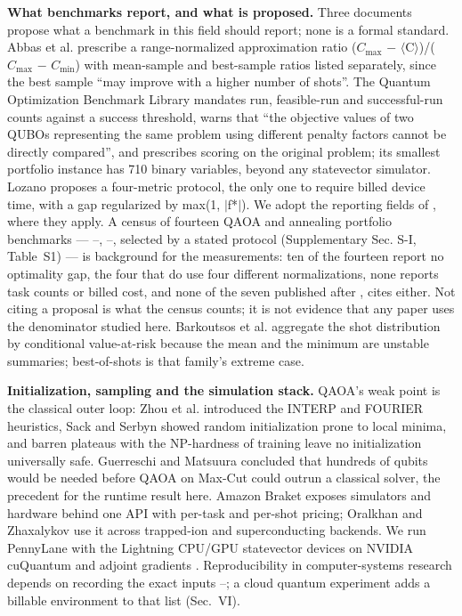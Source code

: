 \documentclass{ieeeaccess}
\begin{document}
\textbf{What benchmarks report, and what is proposed.} Three documents propose what a benchmark in this field should report; none is a formal standard. Abbas et al. \cite{ref19} prescribe a range-normalized approximation ratio ($C_{\mathrm{max}}$ $-$ $\langle$C$\rangle$)/($C_{\mathrm{max}}$ $-$ $C_{\mathrm{min}}$) with mean-sample and best-sample ratios listed separately, since the best sample ``may improve with a higher number of shots''. The Quantum Optimization Benchmark Library \cite{ref20} mandates run, feasible-run and successful-run counts against a success threshold, warns that ``the objective values of two QUBOs representing the same problem using different penalty factors cannot be directly compared'', and prescribes scoring on the original problem; its smallest portfolio instance has 710 binary variables, beyond any statevector simulator. Lozano \cite{ref21} proposes a four-metric protocol, the only one to require billed device time, with a gap regularized by max(1, $|$f*$|$). We adopt the reporting fields of \cite{ref19}, \cite{ref20} where they apply. A census of fourteen QAOA and annealing portfolio benchmarks --- \cite{ref8}--\cite{ref15}, \cite{ref22}--\cite{ref27}, selected by a stated protocol (Supplementary Sec. S-I, Table~S1) --- is background for the measurements: ten of the fourteen report no optimality gap, the four that do use four different normalizations, none reports task counts or billed cost, and none of the seven published after \cite{ref19}, \cite{ref20} cites either. Not citing a proposal is what the census counts; it is not evidence that any paper uses the denominator studied here. Barkoutsos et al. \cite{ref28} aggregate the shot distribution by conditional value-at-risk because the mean and the minimum are unstable summaries; best-of-shots is that family's extreme case.


\textbf{Initialization, sampling and the simulation stack.} QAOA's weak point is the classical outer loop: Zhou et al. \cite{ref29} introduced the INTERP and FOURIER heuristics, Sack and Serbyn \cite{ref30} showed random initialization prone to local minima, and barren plateaus \cite{ref31} with the NP-hardness of training \cite{ref32} leave no initialization universally safe. Guerreschi and Matsuura \cite{ref33} concluded that hundreds of qubits would be needed before QAOA on Max-Cut could outrun a classical solver, the precedent for the runtime result here. Amazon Braket \cite{ref34} exposes simulators and hardware behind one API with per-task and per-shot pricing; Oralkhan and Zhaxalykov \cite{ref23} use it across trapped-ion and superconducting backends. We run PennyLane \cite{ref35} with the Lightning CPU/GPU statevector devices on NVIDIA cuQuantum \cite{ref36} and adjoint gradients \cite{ref37}. Reproducibility in computer-systems research depends on recording the exact inputs \cite{ref38}--\cite{ref40}; a cloud quantum experiment adds a billable environment to that list (Sec.~VI).
\end{document}
